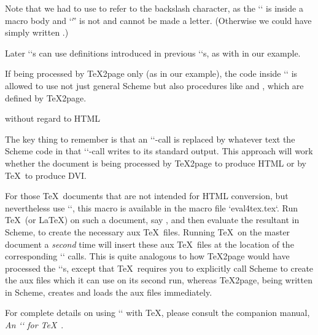 \begintt
\ifx\shipout\UnDeFiNeD
{}

\def\spaceifnotempty{\eval{
\endtt
\begintts
(let ((x (ungroup (get-token))))
  (if (not (all-blanks? x))
      (begin (display (integer->char 92))
             (display "space"))
      0))
\endtt
\begintt
}}
\fi
\endtt
Note that we had to use  to refer to the
backslash character, as the `\eval` is inside a macro body and ‘`\`’
is not and cannot be made a letter.
(Otherwise we could have simply written .)

Later `\eval`s can
use definitions introduced in previous `\eval`s,
as with  in our example.

If being processed by \TeX2page only (as in our example),
the code inside `\eval` is allowed to use not just general Scheme
but also procedures like
 and , which are defined by
\TeX2page.

 without regard to HTML

%
The key thing to remember is that
an `\eval`-call is replaced by whatever text the
Scheme code in that `\eval`-call writes to its
standard output.  This approach will work whether the
document is being processed by \TeX2page to produce HTML
or by \TeX\ to produce DVI.

For those \TeX\ documents that are not intended for HTML conversion, but
nevertheless use `\eval`, this macro is available in the macro file
`eval4tex.tex`.  Run \TeX\ (or \LaTeX) on such a document, say
, and then evaluate
the resultant  in Scheme, to create the
necessary aux \TeX\ files.  Running \TeX\ on the master document a {\em second}
time will
insert these aux \TeX\ files at the location of the corresponding `\eval`
calls.  This is quite analogous to how \TeX2page would have processed the
`\eval`s, except that \TeX\ requires you to explicitly call Scheme to
create the aux files which it can use on its second run, whereas
\TeX2page, being written in Scheme, creates and loads the aux files
immediately.

For complete details on using `\eval` with
\TeX, please consult the companion manual,
{\em An `\eval` for
\TeX}~\cite{eval4tex}.


